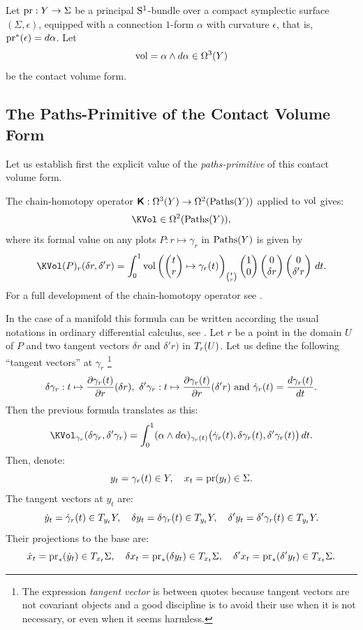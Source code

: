 \documentclass[11pt,reqno,letterpaper,twoside]{amsart}
\begin{document}
  Let $\pr: Y \to \Sigma$ be a principal $\mathrm{S}^1$-bundle over a compact symplectic surface $(\Sigma, \epsilon)$,
  equipped with a connection $1$-form $\alpha$ with curvature $\epsilon$,
  that is,
  $\pr^*(\epsilon) = d\alpha$.
  Let
  $$
    \mathrm{vol} = \alpha \wedge d\alpha \in \Omega^3(Y)
    $$
  be the contact volume form.
  
  \subsection{The Paths-Primitive of the Contact Volume Form}
  Let us establish first the explicit value of the \emph{paths-primitive} of this contact volume form.
  
  The chain-homotopy operator $\boldsymbol{\mathsf{K}}: \Omega^3(Y) \to \Omega^2(\operatorname{Paths}(Y))$ applied to $\mathrm{vol}$ gives:
  \[
    \KVol \in \DForms^2(\Paths(Y)),
    \]
  where its formal value on any plots $P : r \mapsto \gamma_r$ in $\operatorname{Paths}(Y)$ is given by
  $$
    \KVol(P)_r(\delta r, \delta'r) = \int_0^1 \Vol\left(\Vector{t \\ r} \mapsto \gamma_r(t)\right)_{\binom{t}{r}}\Vector{1 \\ 0} \Vector{0 \\ \delta r} \Vector{0 \\ \delta' r}  \, dt.
    $$
  For a full development of the chain-homotopy operator see \cite[]{PIZ13}.
  
  In the case of a manifold this formula can be written according the usual notations in ordinary differential calculus,
  see \cite[]{PIZ13}.
  Let $r$ be a point in the domain $U$ of $P$ and two tangent vectors $\delta r$ and $\delta' r)$ in $T_r(U)$.
  Let us define the following ``tangent vectors'' at $\gamma_r$%
  \footnote{The expression \emph{tangent vector} is between quotes because tangent vectors are not covariant objects and a good discipline is to avoid their use when it is not necessary,
  or even when it seems harmless.}
  $$
    \delta\gamma_r: t \mapsto \frac{\partial \gamma_r(t)}{\partial r} (\delta r), \ \delta' \gamma_r: t \mapsto \frac{\partial \gamma_r(t)}{\partial r} (\delta' r)
    \ \text{and}\  \dot\gamma_r(t) = \frac{d\gamma_r(t)}{dt}.
    $$
  Then the previous formula translates as this:
  \[
    \KVol_{\gamma_r}(\delta\gamma_r, \delta'\gamma_r)
    = \int_0^1 (\alpha \wedge d\alpha)_{\gamma_r(t)}
    \bigl( \dot\gamma_r(t), \delta\gamma_r(t), \delta'\gamma_r(t) \bigr) \, dt.
    \]
  Then,
  denote:
  \[
    y_t = \gamma_r(t) \in Y,
    \quad
    x_t = \pr(y_t) \in \Sigma.
    \]
  The tangent vectors at $y_t$ are:
  \[
    \dot y_t = \dot\gamma_r(t) \in T_{y_t}Y,
    \quad
    \delta y_t = \delta\gamma_r(t) \in T_{y_t}Y,
    \quad
    \delta' y_t = \delta'\gamma_r(t) \in T_{y_t}Y.
    \]
  Their projections to the base are:
  \[
    \dot x_t = \pr_*(\dot y_t) \in \Tgt_{x_t}\Sigma,
    \quad
    \delta x_t = \pr_*(\delta y_t) \in \Tgt_{x_t}\Sigma,
    \quad
    \delta' x_t = \pr_*(\delta' y_t) \in \Tgt_{x_t}\Sigma.
    \]
  
\end{document}
